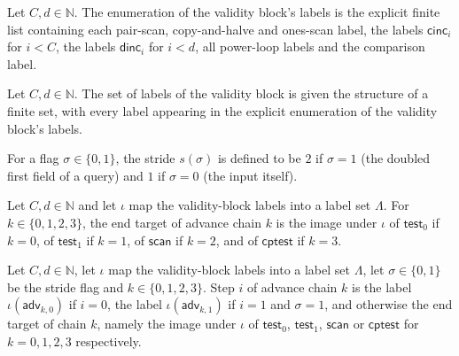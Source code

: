 \begin{definition}
\label{Complexity.epadVLAll}
\leanok
{}
Let $C, d \in \mathbb{N}$. The enumeration of the validity block's labels is the explicit finite
list containing each pair-scan, copy-and-halve and ones-scan label, the labels
$\mathsf{cinc}_i$ for $i < C$, the labels $\mathsf{dinc}_i$ for $i < d$, all power-loop labels and
the comparison label.
\end{definition}

\begin{definition}
\label{Complexity.epadVLFintype}
\leanok
{}
Let $C, d \in \mathbb{N}$. The set of labels of the validity block is given the structure of a
finite set, with every label appearing in the explicit enumeration of the validity block's
labels.
\end{definition}

\begin{definition}
\label{Complexity.epadS}
\leanok
For a flag $\sigma \in \{0,1\}$, the stride $s(\sigma)$ is defined to be $2$ if $\sigma = 1$ (the
doubled first field of a query) and $1$ if $\sigma = 0$ (the input itself).
\end{definition}

\begin{definition}
\label{Complexity.epadAdvEnd}
\leanok
{}
Let $C, d \in \mathbb{N}$ and let $\iota$ map the validity-block labels into a label set
$\Lambda$. For $k \in \{0,1,2,3\}$, the end target of advance chain $k$ is the image under $\iota$
of $\mathsf{test}_0$ if $k = 0$, of $\mathsf{test}_1$ if $k = 1$, of $\mathsf{scan}$ if $k = 2$, and
of $\mathsf{cptest}$ if $k = 3$.
\end{definition}

\begin{definition}
\label{Complexity.epadAdv}
\leanok
{}
Let $C, d \in \mathbb{N}$, let $\iota$ map the validity-block labels into a label set $\Lambda$,
let $\sigma \in \{0,1\}$ be the stride flag and $k \in \{0,1,2,3\}$. Step $i$ of advance chain $k$
is the label $\iota(\mathsf{adv}_{k,0})$ if $i = 0$, the label $\iota(\mathsf{adv}_{k,1})$ if
$i = 1$ and $\sigma = 1$, and otherwise the end target of chain $k$, namely the image under
$\iota$ of $\mathsf{test}_0$, $\mathsf{test}_1$, $\mathsf{scan}$ or $\mathsf{cptest}$ for
$k = 0, 1, 2, 3$ respectively.
\end{definition}

